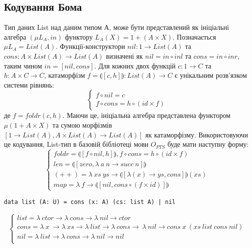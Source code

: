 \subsection{Кодування Бома}
Тип даних List над даним типом А, може бути представлений як ініціальні алгебра
$(\mu L_A, in)$ функтору $L_A(X) = 1 + (A \times X)$. Позначається $\mu L_A = List(A)$.
Функції-конструктори $nil: 1 \rightarrow List(A)$ та
$cons: A \times List(A) \rightarrow List(A)$ визначені як
$nil = in \circ inl$ та $cons = in \circ inr$, таким чином $in = [nil,cons]$.
Для кожних двох функцій $c: 1 \rightarrow C$ та $h: A \times C \rightarrow C$,
катаморфізм $f = \llparenthesis [c,h] \rrparenthesis : List(A) \rightarrow C$
є унікальним розв'язком системи рівнянь:
$$
\begin{cases}
  f \circ nil  = c \\
  f \circ cons = h \circ (id \times f)
\end{cases}
$$
де $f = foldr(c,h)$. Маючи це, ініціальна алгебра представлена функтором
$\mu (1 + A \times X)$ та сумою морфізмів
$[1 \rightarrow List(A), A \times List(A) \rightarrow List(A)]$
як катаморфізму. Використовуючи це кодування, List-тип в базовій бібліотеці мови $O_{PTS}$
буде мати наступну форму:
$$
\begin{cases}
 foldr = \llparenthesis [ f \circ nil , h] \rrparenthesis, f \circ cons = h \circ (id \times f)\\
 len = \llparenthesis [ zero, \lambda\ a\ n \rightarrow succ\ n ] \rrparenthesis \\
 (++) = \lambda\ xs\ ys \rightarrow \llparenthesis [ \lambda (x) \rightarrow ys, cons ] \rrparenthesis (xs) \\
 map = \lambda\ f \rightarrow \llparenthesis [ nil, cons \circ (f \times id)] \rrparenthesis
\end{cases}
$$
\begin{lstlisting}[mathescape=true]
data list (A: U) = cons (x: A) (cs: list A) | nil
\end{lstlisting}
$$
\begin{cases}
list = \lambda\ ctor \rightarrow \lambda\ cons \rightarrow \lambda\ nil \rightarrow ctor\\
cons = \lambda\ x\ \rightarrow \lambda\ xs \rightarrow \lambda\ list \rightarrow \lambda\ cons \rightarrow\ \lambda\ nil \rightarrow cons\ x\ (xs\ list\ cons\ nil)\\
nil = \lambda\ list \rightarrow \lambda\ cons \rightarrow \lambda\ nil \rightarrow nil\\
\end{cases}
$$
